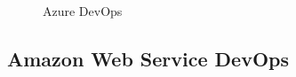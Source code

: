 \begin{figure}[H]
    \begin{center}
    

    \end{center}
    
    \caption{Azure DevOps}
\end{figure}

\subsection{\selectfont\Large Amazon Web Service DevOps}

